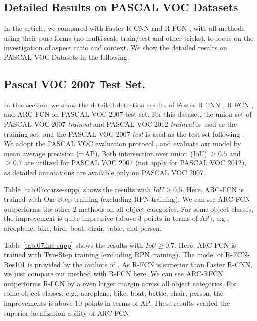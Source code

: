 \documentclass[10pt,twocolumn,letterpaper]{article}
\begin{document}
\begin{appendix}
\section{Detailed Results on PASCAL VOC Datasets}
In the article, we compared with Faster R-CNN \cite{faster_rcnn} and R-FCN \cite{rfcn}, with all methods using their pure forms (no multi-scale train/test and other tricks), to focus on the investigation of aspect ratio and context. We show the detailed results on PASCAL VOC Datasets \cite{pascal} in the following. 

\subsection{Pascal VOC 2007 Test Set.} 
In this section, we  show the detailed detection results of Faster R-CNN \cite{faster_rcnn}, R-FCN \cite{rfcn}, and ARC-FCN on PASCAL VOC 2007 test set. 
For this dataset, the union set of PASCAL VOC 2007 \textit{trainval} and PASCAL VOC 2012 \textit{trainval} is used as the training set, and the PASCAL VOC 2007 \textit{test} is used as the test set following \cite{faster_rcnn,rfcn}.
We adopt the PASCAL VOC evaluation protocol \cite{pascal}, and evaluate our model by mean average precision (mAP).
Both intersection over union (IoU) $\ge 0.5$ and $\ge 0.7$ are utilized for PASCAL VOC 2007 (not apply for PASCAL VOC 2012), as detailed annotations are available only
on PASCAL VOC 2007.



Table \ref{tab:07coarse-supp} shows the results with $IoU \ge 0.5$. Here, ARC-FCN is trained with One-Step training (excluding RPN training). We can see ARC-FCN outperforms the other $2$ methods on all object categories. For some object classes, the improvement is quite impressive (above $3$ points in terms of AP), e.g., areoplane, bike, bird, boat, chair, table, and person.

Table \ref{tab:07fine-supp} shows the results with $IoU \ge 0.7$. Here, ARC-FCN is trained with Two-Step training (excluding RPN training). The model of R-FCN-Res101 is provided by the authors of \cite{rfcn}. As R-FCN is superior than Faster R-CNN, we just compare our method with R-FCN here. 
We can see ARC-RFCN outperforms R-FCN by a even larger margin across all object categories. For some object classes, e.g., aeroplane, bike, boat, bottle, chair, person, the improvements is above $10$ points in terms of AP. These results verified the superior localization ability of ARC-FCN.


\end{appendix}
\end{document}
